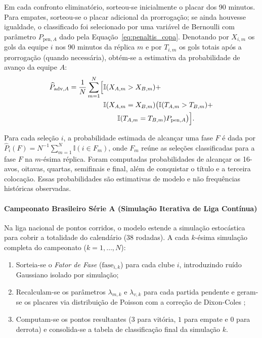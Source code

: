 \documentclass[12pt]{article}
\begin{document}
Em cada confronto eliminatório, sorteou-se inicialmente o placar dos 90 minutos. Para empates, sorteou-se o placar adicional da prorrogação; se ainda houvesse igualdade, o classificado foi selecionado por uma variável de Bernoulli com parâmetro $P_{\mathrm{pen},A}$ dado pela Equação~\ref{eq:penaltis_copa}. Denotando por $X_{i,m}$ os gols da equipe $i$ nos 90 minutos da réplica $m$ e por $T_{i,m}$ os gols totais após a prorrogação (quando necessária), obtém-se a estimativa da probabilidade de avanço da equipe $A$:
\begin{equation}
\begin{aligned}
 \widehat P_{\mathrm{adv},A}=\frac{1}{N}\sum_{m=1}^N\Bigl[&
 \mathbb{I}(X_{A,m}>X_{B,m})+\\
 &\mathbb{I}(X_{A,m}=X_{B,m})\bigl(
 \mathbb{I}(T_{A,m}>T_{B,m})+\\
 &\qquad\mathbb{I}(T_{A,m}=T_{B,m})P_{\mathrm{pen},A}
 \bigr)\Bigr].
\end{aligned}
 \label{eq:montecarlo_copa}
\end{equation}

Para cada seleção $i$, a probabilidade estimada de alcançar uma fase $F$ é dada por $\widehat P_i(F)=N^{-1}\sum_{m=1}^{N}\mathbb{I}(i\in F_m)$, onde $F_m$ reúne as seleções classificadas para a fase $F$ na $m$-ésima réplica. Foram computadas probabilidades de alcançar os 16-avos, oitavas, quartas, semifinais e final, além de conquistar o título e a terceira colocação. Essas probabilidades são estimativas de modelo e não frequências históricas observadas.

\paragraph{Campeonato Brasileiro Série A (Simulação Iterativa de Liga Contínua)}
Na liga nacional de pontos corridos, o modelo estende a simulação estocástica para cobrir a totalidade do calendário (38 rodadas). A cada $k$-ésima simulação completa do campeonato ($k = 1, \dots, N$):
\begin{enumerate}
	\item Sorteia-se o \textit{Fator de Fase} ($\mathrm{fase}_{i, k}$) para cada clube $i$, introduzindo ruído Gaussiano isolado por simulação;
	\item Recalculam-se os parâmetros $\lambda_{m, k}$ e $\lambda_{v, k}$ para cada partida pendente e geram-se os placares via distribuição de Poisson com a correção de Dixon-Coles \cite{dixon1997};
	\item Computam-se os pontos resultantes ($3$ para vitória, $1$ para empate e $0$ para derrota) e consolida-se a tabela de classificação final da simulação $k$.
\end{enumerate}
\end{document}
